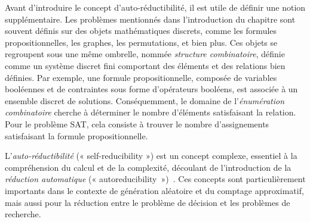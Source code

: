 Avant d'introduire le concept d'auto-réductibilité, il est utile de définir une notion supplémentaire. Les problèmes mentionnés dans l'introduction du chapitre sont souvent définis sur des objets mathématiques discrets, comme les formules propositionnelles, les graphes, les permutations, et bien plus. Ces objets se regroupent sous une même ombrelle, nommée \textit{structure combinatoire}, définie comme un système discret fini comportant des éléments et des relations bien définies. Par exemple, une formule propositionnelle, composée de variables booléennes et de contraintes sous forme d'opérateurs booléens, est associée à un ensemble discret de solutions. Conséquemment, le domaine de l'\textit{énumération combinatoire} cherche à déterminer le nombre d'éléments satisfaisant la relation. Pour le problème SAT, cela consiste à trouver le nombre d'assignements satisfaisant la formule propositionnelle.

L'\textit{auto-réductibilité} (« self-reducibility ») est un concept complexe, essentiel à la compréhension du calcul et de la complexité, découlant de l'introduction de la \textit{réduction automatique} (« autoreducibility »)~\cite{trakhtenbrotAutoreducibility1970, selkeAutoreducibilityFriendsMeasuring2006}. Ces concepts sont particulièrement importants dans le contexte de génération aléatoire et du comptage approximatif, mais aussi pour la réduction entre le problème de décision et les problèmes de recherche.

